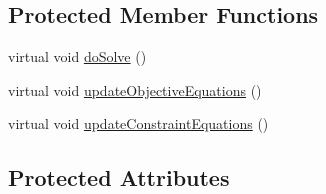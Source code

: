 \subsection*{Protected Member Functions}
\begin{DoxyCompactItemize}
\item 
virtual void \hyperlink{classocra_1_1OneLevelSolverWithQLD_ac7cce5bd375142ca0c74cd71300b15a5}{do\+Solve} ()
\item 
virtual void \hyperlink{classocra_1_1OneLevelSolverWithQLD_a23556b4af1bdbead4ecb242991dbd175}{update\+Objective\+Equations} ()
\item 
virtual void \hyperlink{classocra_1_1OneLevelSolverWithQLD_abc304c0e5f9234ca4230f7b67b02a0c0}{update\+Constraint\+Equations} ()
\end{DoxyCompactItemize}
\subsection*{Protected Attributes}
